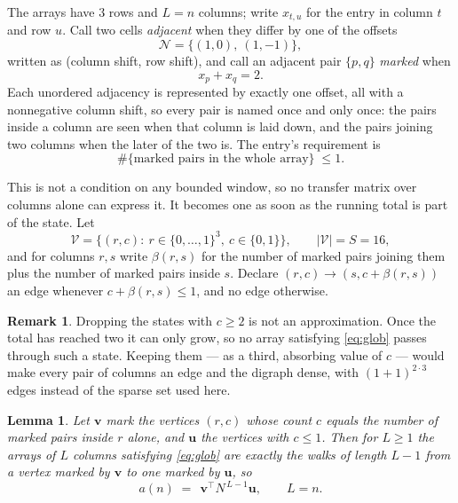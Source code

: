 \documentclass[11pt,a4paper]{article}
\theoremstyle{plain}
\newtheorem{lemma}[theorem]{Lemma}
\theoremstyle{definition}
\newtheorem{remark}[theorem]{Remark}
\begin{document}
The arrays have $3$ rows and $L=n$ columns; write $x_{t,u}$ for the entry in
column $t$ and row $u$. Call two cells \emph{adjacent} when they differ by one of the
offsets
\[
\mathcal N=\{(1,0),\ (1,-1)\},
\]
written as (column shift, row shift), and call an adjacent pair $\{p,q\}$
\emph{marked} when
\[
x_{p}+x_{q}=2 .
\]
Each unordered adjacency is represented by exactly one offset, all with a nonnegative column
shift, so every pair is named once and only once: the pairs inside a column are seen when
that column is laid down, and the pairs joining two columns when the later of the two is. The
entry's requirement is
\begin{equation}\label{eq:glob}
\#\{\text{marked pairs in the whole array}\}\;\le1.
\end{equation}

This is not a condition on any bounded window, so no transfer matrix over columns alone can
express it. It becomes one as soon as the running total is part of the state. Let
\[
\mathcal V=\bigl\{(r,c):\ r\in\{0,\dots,1\}^{3},\ c\in\{0,1\}\bigr\},
\qquad |\mathcal V|=S=16,
\]
and for columns $r,s$ write $\beta(r,s)$ for the number of marked pairs joining them plus the
number of marked pairs inside $s$. Declare $(r,c)\to(s,c+\beta(r,s))$ an edge whenever
$c+\beta(r,s)\le1$, and no edge otherwise.

\begin{remark}
Dropping the states with $c\ge2$ is not an approximation. Once the total has reached two it
can only grow, so no array satisfying \eqref{eq:glob} passes through such a state. Keeping
them --- as a third, absorbing value of $c$ --- would make every pair of columns an edge and
the digraph dense, with $(1+1)^{2\cdot3}$ edges instead of the sparse set used here.
\end{remark}

\begin{lemma}\label{lem:walk}
Let $\mathbf{v}$ mark the vertices $(r,c)$ whose count $c$ equals the number of marked pairs
inside $r$ alone, and $\mathbf{u}$ the vertices with $c\le1$. Then for $L\ge1$ the arrays
of $L$ columns satisfying \eqref{eq:glob} are exactly the walks of length $L-1$ from a
vertex marked by $\mathbf{v}$ to one marked by $\mathbf{u}$, so
\[
a(n)\;=\;\,\mathbf{v}^{\!\top}N^{\,L-1}\mathbf{u},\qquad L=n .
\]
\end{lemma}
\end{document}
